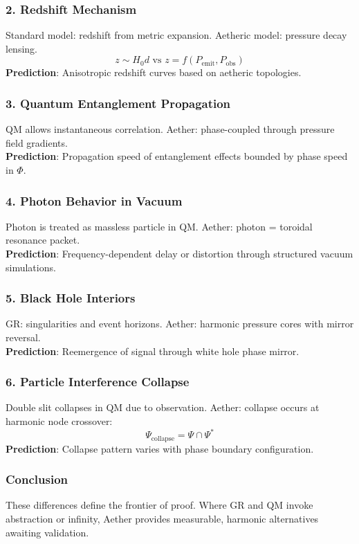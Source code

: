 \subsubsection*{2. Redshift Mechanism}
Standard model: redshift from metric expansion. Aetheric model: pressure decay lensing.
\[
z \sim H_0 d \text{ vs } z = f \left( P_{\text{emit}}, P_{\text{obs}} \right)
\]
\textbf{Prediction}: Anisotropic redshift curves based on aetheric topologies.

\subsubsection*{3. Quantum Entanglement Propagation}
QM allows instantaneous correlation. Aether: phase-coupled through pressure field gradients. \\
\textbf{Prediction}: Propagation speed of entanglement effects bounded by phase speed in \( \Phi \).

\subsubsection*{4. Photon Behavior in Vacuum}
Photon is treated as massless particle in QM. Aether: photon = toroidal resonance packet. \\
\textbf{Prediction}: Frequency-dependent delay or distortion through structured vacuum simulations.

\subsubsection*{5. Black Hole Interiors}
GR: singularities and event horizons. Aether: harmonic pressure cores with mirror reversal. \\
\textbf{Prediction}: Reemergence of signal through white hole phase mirror.

\subsubsection*{6. Particle Interference Collapse}
Double slit collapses in QM due to observation. Aether: collapse occurs at harmonic node crossover:
\[
\Psi_{\text{collapse}} = \Psi \cap \Psi^*
\]
\textbf{Prediction}: Collapse pattern varies with phase boundary configuration.

\subsubsection*{Conclusion}
These differences define the frontier of proof. Where GR and QM invoke abstraction or infinity, Aether provides measurable, harmonic alternatives awaiting validation.

